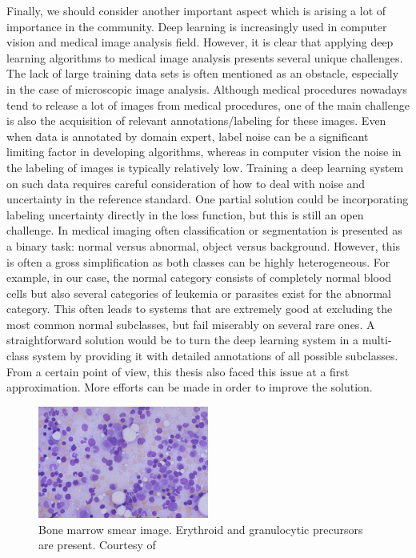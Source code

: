 \documentclass[final,a4paper,12pt,english]{UnicaPhdThesis3}
\begin{document}
{Finally, we should consider another important aspect which is arising a lot of importance in the community. Deep learning is increasingly used in computer vision and medical image analysis field. However, it is clear that applying deep learning algorithms to medical image analysis presents several unique challenges. The lack of large training data sets is often mentioned as an obstacle, especially in the case of microscopic image analysis. Although medical procedures nowadays tend to release a lot of images from medical procedures, one of the main challenge is also the acquisition of relevant annotations/labeling for these images.
Even when data is annotated by domain expert, label noise can be a significant limiting factor in developing algorithms, whereas in computer vision the noise in the labeling of images is typically relatively low. Training a deep learning system on such data requires careful consideration of how to deal with noise and uncertainty in the reference standard. One partial solution could be incorporating labeling uncertainty directly in the loss function, but this is still an open challenge.
In medical imaging often classification or segmentation is presented as a binary task: normal versus abnormal, object versus background. However, this is often a gross simplification as both classes can be highly heterogeneous. For example, in our case, the normal category consists of completely normal blood cells but also several categories of leukemia or parasites exist for the abnormal category. This often leads to systems that are extremely good at excluding the most common normal subclasses, but fail miserably on several rare ones. A straightforward solution would be to turn the deep learning system in a multi-class system by providing it with detailed annotations of all possible subclasses. From a certain point of view, this thesis also faced this issue at a first approximation. More efforts can be made in order to improve the solution. 


\begin{figure}[h]
	\centering
	\includegraphics[width=0.5\textwidth]{images/bone_marrow}
	\caption{\label{fig:bone_marrow} Bone marrow smear image. Erythroid and granulocytic precursors are present. Courtesy of \cite{Med_Utah}}
\end{figure}


}
\end{document}
